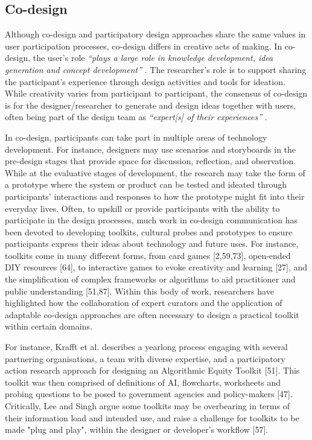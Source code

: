 \subsection{Co-design}
\label{co-design}
Although co-design and participatory design approaches share the same values in user participation processes, co-design differs in creative acts of making. In co-design, the user's role \textit{``plays a large role in knowledge development, idea generation and concept development''} \citep{sanders2008co}. The researcher's role is to support sharing the participant's experience through design activities and tools for ideation. While creativity varies from participant to participant, the consensus of co-design is for the designer/researcher to generate and design ideas together with users, often being part of the design team as \textit{``expert[s] of their experiences''} \citep{visser2005contextmapping}.   

In co-design, participants can take part in multiple areas of technology development. For instance, designers may use scenarios and storyboards in the pre-design stages that provide space for discussion, reflection, and observation. While at the evaluative stages of development, the research may take the form of a prototype where the system or product can be tested and ideated through participants' interactions and responses to how the prototype might fit into their everyday lives. Often, to upskill or provide participants with the ability to participate in the design processes, much work in co-design communication has been devoted to developing toolkits, cultural probes and prototypes to ensure participants express their ideas about technology and future uses. For instance, toolkits come in many different forms, from card games [2,59,73], open-ended DIY resources [64], to interactive games to evoke creativity and learning [27], and the simplification of complex frameworks or algorithms to aid practitioner and public understanding [51,87]. Within this body of work, researchers have highlighted how the collaboration of expert curators and the application of adaptable co-design approaches are often necessary to design a practical toolkit within certain domains. 

For instance, Krafft et al. describes a yearlong process engaging with several partnering organisations, a team with diverse expertise, and a participatory action research approach for designing an Algorithmic Equity Toolkit [51]. This toolkit was then comprised of definitions of AI, flowcharts, worksheets and probing questions to be posed to government agencies and policy-makers [47]. Critically, Lee and Singh argue some toolkits may be overbearing in terms of their information load and intended use, and raise a challenge for toolkits to be made "plug and play", within the designer or developer's workflow [57]. 

